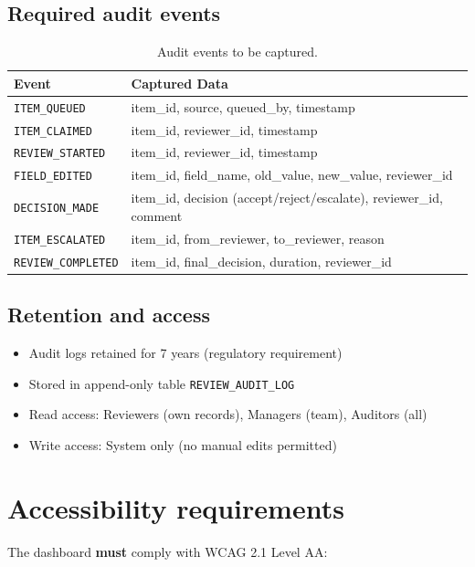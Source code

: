 \documentclass[11pt,a4paper,twoside]{report}
\begin{document}
\subsection{Required audit events}

\begin{table}[htbp]
\centering
\caption{Audit events to be captured.}
\label{tab:audit-events}
\footnotesize
\begin{tabularx}{\linewidth}{@{}l X@{}}
\toprule
\textbf{Event} & \textbf{Captured Data} \\ \midrule
\texttt{ITEM\_QUEUED} & item\_id, source, queued\_by, timestamp \\
\texttt{ITEM\_CLAIMED} & item\_id, reviewer\_id, timestamp \\
\texttt{REVIEW\_STARTED} & item\_id, reviewer\_id, timestamp \\
\texttt{FIELD\_EDITED} & item\_id, field\_name, old\_value, new\_value, reviewer\_id \\
\texttt{DECISION\_MADE} & item\_id, decision (accept/reject/escalate), reviewer\_id, comment \\
\texttt{ITEM\_ESCALATED} & item\_id, from\_reviewer, to\_reviewer, reason \\
\texttt{REVIEW\_COMPLETED} & item\_id, final\_decision, duration, reviewer\_id \\
\bottomrule
\end{tabularx}
\end{table}

\subsection{Retention and access}

\begin{itemize}
\item Audit logs retained for 7 years (regulatory requirement)
\item Stored in append-only table \texttt{REVIEW\_AUDIT\_LOG}
\item Read access: Reviewers (own records), Managers (team), Auditors (all)
\item Write access: System only (no manual edits permitted)
\end{itemize}

\section{Accessibility requirements}

The dashboard \textbf{must} comply with WCAG 2.1 Level AA:
\end{document}
